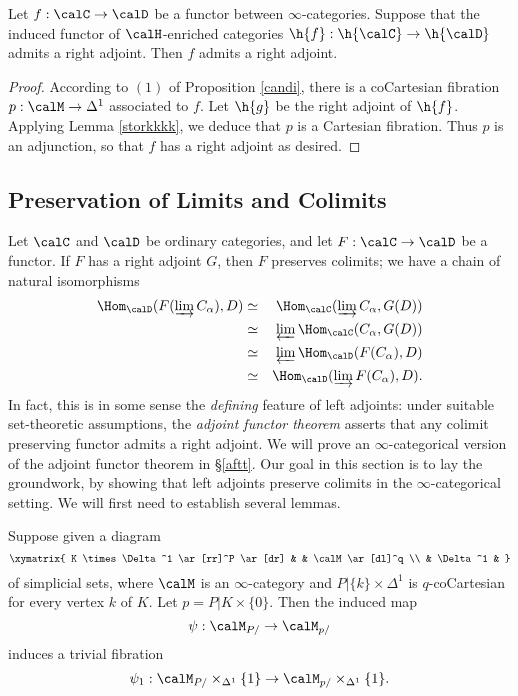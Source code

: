 \begin{proposition}\label{sumpytump}
Let $f: \calC \rightarrow \calD$ be a functor between $\infty$-categories. Suppose that
the induced functor of $\calH$-enriched categories $\h{f}: \h{\calC} \rightarrow \h{\calD}$ admits a right adjoint. Then $f$ admits a right adjoint.
\end{proposition}

\begin{proof}
According to $(1)$ of Proposition \ref{candi}, there is a coCartesian fibration
$p: \calM \rightarrow \Delta^1$ associated to $f$. Let $\h{g}$ be the right adjoint of
$\h{f}$. Applying Lemma \ref{storkkkk}, we deduce that $p$ is a Cartesian fibration. Thus
$p$ is an adjunction, so that $f$ has a right adjoint as desired.
\end{proof}

\subsection{Preservation of Limits and Colimits}\label{afunc3}

Let $\calC$ and $\calD$ be ordinary categories, and let $F: \calC \rightarrow \calD$ be a functor.
If $F$ has a right adjoint $G$, then $F$ preserves colimits; we have a chain of natural isomorphisms
\begin{eqnarray*}
\Hom_{\calD}( F (\varinjlim C_{\alpha}), D) & \simeq & \Hom_{\calC}( \varinjlim C_{\alpha}, G(D)) \\
& \simeq & \varprojlim \Hom_{\calC}( C_{\alpha}, G(D)) \\
& \simeq & \varprojlim \Hom_{\calD}(F(C_{\alpha}), D) \\
& \simeq & \Hom_{\calD}( \varinjlim F(C_{\alpha}), D).
\end{eqnarray*}
In fact, this is in some sense the {\em defining} feature of left adjoints: under suitable set-theoretic assumptions, the {\em adjoint functor theorem} asserts that any colimit preserving functor admits a right adjoint. We will prove an $\infty$-categorical version of the adjoint functor theorem in \S \ref{aftt}. Our goal in this section is to lay the groundwork, by showing that left adjoints preserve colimits in the $\infty$-categorical setting. We will first need to establish several lemmas.

\begin{lemma}\label{lotusss}
Suppose given a diagram
$$ \xymatrix{ K \times \Delta^1 \ar[rr]^P \ar[dr] & & \calM \ar[dl]^q \\
& \Delta^1 & }$$
of simplicial sets, where $\calM$ is an $\infty$-category and $P| \{k\} \times \Delta^1$
is $q$-coCartesian for every vertex $k$ of $K$. Let $p = P| K \times \{0\}$. Then the induced map
$$ \psi: \calM_{P/} \rightarrow \calM_{p/}$$ induces a trivial fibration
$$ \psi_1: \calM_{P/} \times_{\Delta^1} \{1\} \rightarrow \calM_{p/} \times_{\Delta^1} \{1\}.$$
\end{lemma}

